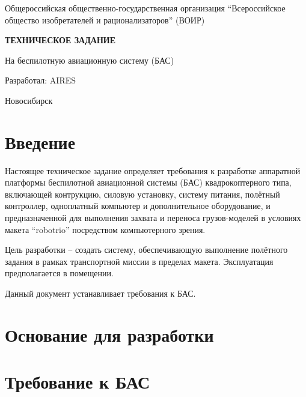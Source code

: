 \documentclass[a4paper, 14pt]{extarticle}
\begin{document}
\setlength{\emergencystretch}{1em}
\begin{titlepage}
  \centering

  Общероссийская общественно-государственная организация 
  ``Всероссийское общество изобретателей и рационализаторов'' (ВОИР)                        

  \vfill

  {\Large\bfseries ТЕХНИЧЕСКОЕ ЗАДАНИЕ\par}
  \vspace{1cm}
  {\large На беспилотную авиационную систему (БАС)\par}
  
  \vfill

  \begin{flushright}
    Разработал: AIRES
  \end{flushright}

  \vfill
  
  Новосибирск\\
  \the\year
\end{titlepage}

\tableofcontents

\newpage

\section{Введение}
Настоящее техническое задание определяет требования к разработке аппаратной платформы беспилотной авиационной системы (БАС) квадрокоптерного типа, включающей контрукцию, силовую установку, систему питания, полётный контроллер, одноплатный компьютер и дополнительное оборудование, и предназначенной для выполнения захвата и переноса грузов-моделей в условиях макета ``robotrio'' посредством компьютерного зрения. 

Цель разработки -- создать систему, обеспечивающую выполнение полётного задания в рамках транспортной миссии в пределах макета. Эксплуатация предполагается в помещении. 

Данный документ устанавливает требования к БАС.

\section{Основание для разработки}

\section{Требование к БАС}
\end{document}
